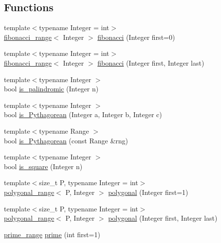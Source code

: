 \subsection*{\-Functions}
\begin{DoxyCompactItemize}
\item 
{\footnotesize template$<$typename Integer  = int$>$ }\\\hyperlink{classyuh_1_1fibonacci__range}{fibonacci\-\_\-range}$<$ \-Integer $>$ \hyperlink{namespaceyuh_a11988532f81d143e1b5b74d461dd8067}{fibonacci} (\-Integer first=0)
\item 
{\footnotesize template$<$typename Integer  = int$>$ }\\\hyperlink{classyuh_1_1fibonacci__range}{fibonacci\-\_\-range}$<$ \-Integer $>$ \hyperlink{namespaceyuh_a17b1d33879798b95bdefe171df90380a}{fibonacci} (\-Integer first, \-Integer last)
\item 
{\footnotesize template$<$typename Integer $>$ }\\bool \hyperlink{namespaceyuh_afc7f4ca69e0d8cb035be348d77d2a33e}{is\-\_\-palindromic} (\-Integer n)
\item 
{\footnotesize template$<$typename Integer $>$ }\\bool \hyperlink{namespaceyuh_a14298c4b76f1a9d0537e7d5d67cfa784}{is\-\_\-\-Pythagorean} (\-Integer a, \-Integer b, \-Integer c)
\item 
{\footnotesize template$<$typename Range $>$ }\\bool \hyperlink{namespaceyuh_af94deeef5a14f79a6a51c6ca3155d03e}{is\-\_\-\-Pythagorean} (const \-Range \&rng)
\item 
{\footnotesize template$<$typename Integer $>$ }\\bool \hyperlink{namespaceyuh_a43d71ed08fec121213f4ad3acbdc4d26}{is\-\_\-square} (\-Integer n)
\item 
{\footnotesize template$<$size\-\_\-t \-P, typename Integer  = int$>$ }\\\hyperlink{classyuh_1_1polygonal__range}{polygonal\-\_\-range}$<$ \-P, \-Integer $>$ \hyperlink{namespaceyuh_ac79b05fba2817ead4f0b5fd4c5a5a805}{polygonal} (\-Integer first=1)
\item 
{\footnotesize template$<$size\-\_\-t \-P, typename Integer  = int$>$ }\\\hyperlink{classyuh_1_1polygonal__range}{polygonal\-\_\-range}$<$ \-P, \-Integer $>$ \hyperlink{namespaceyuh_a1af8d0faca38b0efb8ae71d0f773d3c8}{polygonal} (\-Integer first, \-Integer last)
\item 
\hyperlink{classyuh_1_1prime__range}{prime\-\_\-range} \hyperlink{namespaceyuh_ad0e08caa71b8e5172b1535657bbc0648}{prime} (int first=1)

\end{DoxyCompactItemize}
